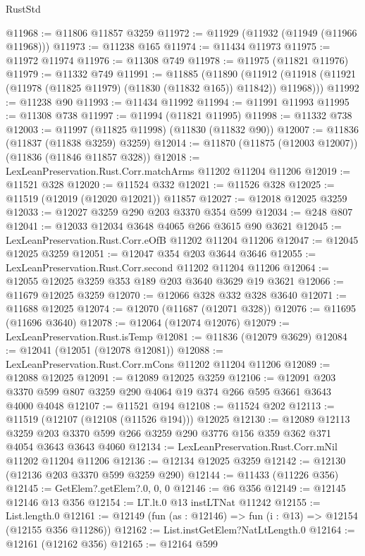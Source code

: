 \begin{lexlean}{RustStd}
\begin{coremodule}
@11968 := @11806 @11857 @3259
@11972 := @11929 (@11932 (@11949 (@11966 @11968)))
@11973 := @11238 @165
@11974 := @11434 @11973
@11975 := @11972 @11974
@11976 := @11308 @749
@11978 := @11975 (@11821 @11976)
@11979 := @11332 @749
@11991 := @11885
    (@11890
      (@11912 (@11918 (@11921 (@11978 (@11825 @11979) (@11830 (@11832 @165)) @11842)) @11968)))
@11992 := @11238 @90
@11993 := @11434 @11992
@11994 := @11991 @11993
@11995 := @11308 @738
@11997 := @11994 (@11821 @11995)
@11998 := @11332 @738
@12003 := @11997 (@11825 @11998) (@11830 (@11832 @90))
@12007 := @11836 (@11837 (@11838 @3259) @3259)
@12014 := @11870 (@11875 (@12003 @12007)) (@11836 (@11846 @11857 @328))
@12018 := LexLeanPreservation.Rust.Corr.matchArms @11202 @11204 @11206
@12019 := @11521 @328
@12020 := @11524 @332
@12021 := @11526 @328
@12025 := @11519 (@12019 (@12020 @12021)) @11857
@12027 := @12018 @12025 @3259
@12033 := @12027 @3259 @290 @203 @3370 @354 @599
@12034 := @248 @807
@12041 := @12033 @12034 @3648 @4065 @266 @3615 @90 @3621
@12045 := LexLeanPreservation.Rust.Corr.eOfB @11202 @11204 @11206
@12047 := @12045 @12025 @3259
@12051 := @12047 @354 @203 @3644 @3646
@12055 := LexLeanPreservation.Rust.Corr.second @11202 @11204 @11206
@12064 := @12055 @12025 @3259 @353 @189 @203 @3640 @3629 @19 @3621
@12066 := @11679 @12025 @3259
@12070 := @12066 @328 @332 @328 @3640
@12071 := @11688 @12025
@12074 := @12070 (@11687 (@12071 @328))
@12076 := @11695 (@11696 @3640)
@12078 := @12064 (@12074 @12076)
@12079 := LexLeanPreservation.Rust.isTemp
@12081 := @11836 (@12079 @3629)
@12084 := @12041 (@12051 (@12078 @12081))
@12088 := LexLeanPreservation.Rust.Corr.mCons @11202 @11204 @11206
@12089 := @12088 @12025
@12091 := @12089 @12025 @3259
@12106 := @12091 @203 @3370 @599 @807 @3259 @290 @4064 @19 @374 @266 @595 @3661 @3643 @4000 @4048
@12107 := @11521 @194
@12108 := @11524 @202
@12113 := @11519 (@12107 (@12108 (@11526 @194))) @12025
@12130 := @12089
    @12113
    @3259
    @203
    @3370
    @599
    @266
    @3259
    @290
    @3776
    @156
    @359
    @362
    @371
    @4054
    @3643
    @3643
    @4060
@12134 := LexLeanPreservation.Rust.Corr.mNil @11202 @11204 @11206
@12136 := @12134 @12025 @3259
@12142 := @12130 (@12136 @203 @3370 @599 @3259 @290)
@12144 := @11433 (@11226 @356)
@12145 := GetElem?.getElem?.{0, 0, 0}
@12146 := @6 @356
@12149 := @12145 @12146 @13 @356
@12154 := LT.lt.{0} @13 instLTNat @11242
@12155 := List.length.{0}
@12161 := @12149 (fun (as : @12146) => fun (i : @13) => @12154 (@12155 @356 @11286))
@12162 := List.instGetElem?NatLtLength.{0}
@12164 := @12161 (@12162 @356)
@12165 := @12164 @599

\end{coremodule}
\end{lexlean}
